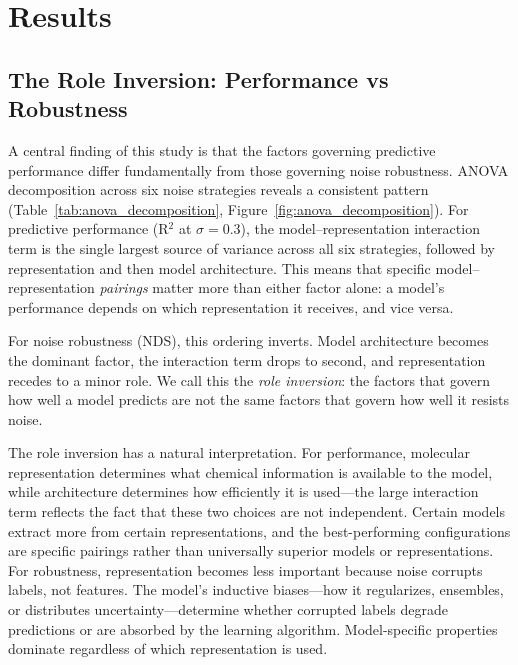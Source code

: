 \documentclass[pdflatex,sn-mathphys-num]{sn-jnl}%
\theoremstyle{thmstyleone}%
\theoremstyle{thmstyletwo}%
\theoremstyle{thmstylethree}%
\begin{document}
\section{Results}

\subsection{The Role Inversion: Performance vs Robustness}\label{sec:role_inversion}

A central finding of this study is that the factors governing predictive performance differ fundamentally from those governing noise robustness. ANOVA decomposition across six noise strategies reveals a consistent pattern (Table~\ref{tab:anova_decomposition}, Figure~\ref{fig:anova_decomposition}). For predictive performance (R$^2$ at $\sigma = 0.3$), the model--representation interaction term is the single largest source of variance across all six strategies, followed by representation and then model architecture. This means that specific model--representation \emph{pairings} matter more than either factor alone: a model's performance depends on which representation it receives, and vice versa.

For noise robustness (NDS), this ordering inverts. Model architecture becomes the dominant factor, the interaction term drops to second, and representation recedes to a minor role. We call this the \emph{role inversion}: the factors that govern how well a model predicts are not the same factors that govern how well it resists noise.

The role inversion has a natural interpretation. For performance, molecular representation determines what chemical information is available to the model, while architecture determines how efficiently it is used---the large interaction term reflects the fact that these two choices are not independent. Certain models extract more from certain representations, and the best-performing configurations are specific pairings rather than universally superior models or representations. For robustness, representation becomes less important because noise corrupts labels, not features. The model's inductive biases---how it regularizes, ensembles, or distributes uncertainty---determine whether corrupted labels degrade predictions or are absorbed by the learning algorithm. Model-specific properties dominate regardless of which representation is used.
\end{document}
